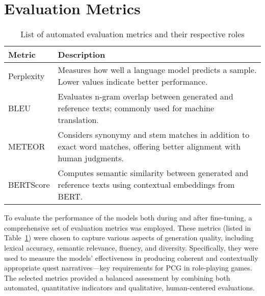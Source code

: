 \section*{Evaluation Metrics}

\begin{table}[t]
  \centering
  \scriptsize
  \renewcommand{\arraystretch}{1.3}
  \begin{tabularx}{0.95\textwidth}{
    >{\raggedright\arraybackslash}p{5cm}
    >{\raggedright\arraybackslash}X
  }
    \toprule
    \textbf{Metric} & \textbf{Description} \\
    \midrule
    Perplexity & Measures how well a language model predicts a sample. Lower values indicate better performance. \\
    BLEU & Evaluates n-gram overlap between generated and reference texts; commonly used for machine translation. \\
    METEOR & Considers synonymy and stem matches in addition to exact word matches, offering better alignment with human judgments. \\
    BERTScore & Computes semantic similarity between generated and reference texts using contextual embeddings from BERT. \\
    \bottomrule
  \end{tabularx}
  \caption{List of automated evaluation metrics and their respective roles}
  \label{table:evaluation-metrics}
\end{table}

To evaluate the performance of the models both during and after fine-tuning, a comprehensive
set of evaluation metrics was employed. These metrics (listed in Table~\ref{table:evaluation-metrics})
were chosen to capture various aspects of generation quality, including lexical accuracy,
semantic relevance, fluency, and diversity. Specifically, they were used to measure the
models' effectiveness in producing coherent and contextually appropriate quest narratives—key
requirements for PCG in role-playing games. The selected metrics provided a
balanced assessment by combining both automated, quantitative indicators and qualitative,
human-centered evaluations.
